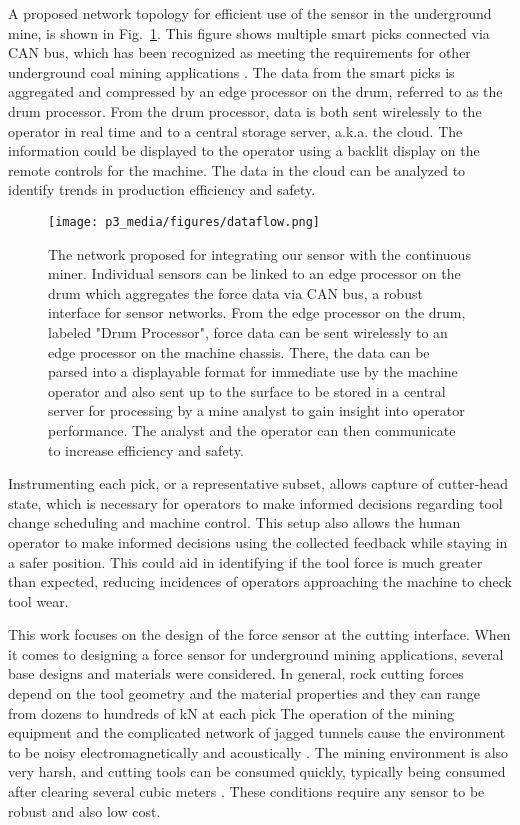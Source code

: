 A proposed network topology for efficient use of the sensor
in the underground mine, is shown in Fig.~\ref{fig:network_proposal}. 
This figure shows multiple smart picks 
connected via CAN bus, which has been recognized as meeting the requirements for 
other underground coal mining applications \cite{Shu2010, Ma2021}. 
The data from the smart picks is aggregated and compressed by an edge processor on the drum,
 referred to as the drum processor.
From the drum processor, data is both sent wirelessly to the 
operator in real time and to a central storage server, a.k.a. the cloud. 
The information could be displayed to the operator using a backlit display 
on the remote controls for the machine.
The data in the cloud can be analyzed to identify trends in production efficiency and safety. 

\begin{figure}[t]
\centering
\texttt{[image: p3\_media/figures/dataflow.png]}
\caption{The network proposed for integrating our sensor with the continuous miner.
Individual sensors can be linked to an edge processor on the drum which aggregates the force data via CAN bus,
a robust interface for sensor networks. From the edge processor on the drum, labeled "Drum Processor",
force data can be sent wirelessly to an edge processor on the machine chassis. 
There, the data can be parsed into a displayable format for
immediate use by the machine operator and also sent up to the surface to be stored in a central server for 
processing by a mine analyst to gain insight into operator performance. 
The analyst and the operator can then communicate to increase efficiency and safety.}
\label{fig:network_proposal}
\end{figure}

Instrumenting each pick, or a representative subset, allows capture of cutter-head state,
which is necessary for operators to make informed decisions 
regarding tool change scheduling and machine control. 
This setup also allows the human operator to make informed decisions using the collected feedback
while staying in a safer position. 
This could aid in identifying if the tool force is much greater than expected,
reducing incidences of operators approaching the machine to check tool wear.

This work focuses on the design of the force sensor at the cutting interface.
When it comes to designing a force sensor for underground mining applications, 
several base designs and materials were considered. 
In general, rock cutting forces depend on the tool geometry and the material properties and
they can range from dozens to hundreds of kN at each pick \cite{Zeng2021, Fan2023, Roxborough1981, Bilgin2006}
The operation of the mining equipment and the complicated network of jagged tunnels cause the 
environment to be noisy electromagnetically and acoustically
\cite{Ikeda2021, Seguel2022, Yarkan2009, Thrybom2015, Ranjan2014}. 
The mining environment is also very harsh, and cutting tools can be consumed quickly, 
typically being consumed after clearing several cubic meters \cite{Hurt1985, Su2020, Rostami2003}.
These conditions require any sensor to be robust and also low cost.

